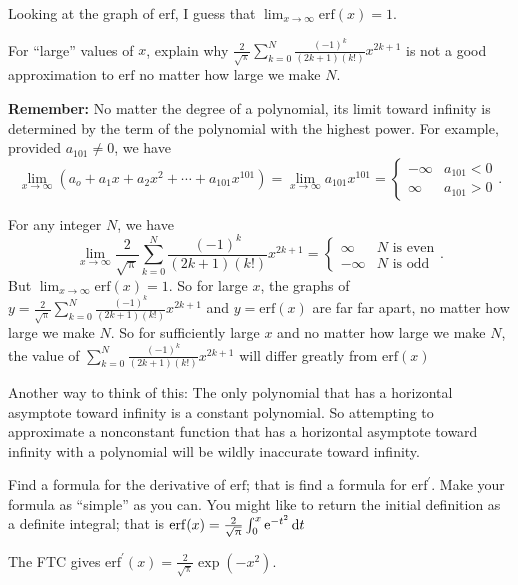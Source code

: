 \documentclass[12pt,fleqn,answers]{exam}
\newcommand{\erf}{\mathrm{erf}}
\begin{document}
\begin{questions}
\begin{solution}%
Looking at the graph of $\erf$, I guess that $\displaystyle \lim_{x \to \infty} \erf(x) = 1$.

\end{solution}

\newpage

\question [1]   For ``large'' values of $x$, explain why 
$\frac{2}{\sqrt{\uppi}}  \sum_{k=0}^{N} \frac{(-1)^k}{ (2 k + 1) (k !)}   x^{2 k +1}$ is not a good approximation to $\erf$
no matter how large we make $N$.  

\textbf{Remember:} No matter the degree of a polynomial, its limit toward infinity is determined 
by the term of the polynomial with the highest power.  For example, provided $a_{101} \neq 0$, we have 
\begin{equation*}
  \lim_{x \to \infty}  \left( a_o + a_1 x + a_2 x^2 + \cdots + a_{101} x^{101} \right)  =  
  \lim_{x \to \infty} a_{101} x^{101}  = \begin{cases}  -\infty & a_{101} < 0 \\ \infty & a_{101} > 0 \end{cases}.
\end{equation*}

\begin{solution}[3.5in]
For any integer $N$, we have $$\lim_{x \to \infty} \frac{2}{\sqrt{\uppi}}  \sum_{k=0}^{N} \frac{(-1)^k}{ (2 k + 1) (k !)}   x^{2 k +1} = \begin{cases} \infty & N \text{ is even} \\ -\infty & N \text{ is odd} \end{cases}. $$ But $\displaystyle \lim_{x \to \infty} \erf(x) = 1$. 
So for large $x$,  the graphs of $y = \frac{2}{\sqrt{\uppi}}  \sum_{k=0}^{N} \frac{(-1)^k}{ (2 k + 1) (k !)}   x^{2 k +1}$
and $y  = \erf(x) $ are far far apart, no matter how large we make $N$.  So for sufficiently large $x$ and no matter how 
large we make $N$, the value of $\sum_{k=0}^{N} \frac{(-1)^k}{ (2 k + 1) (k !)}   x^{2 k +1}$ will differ greatly
from $\erf(x)$

\quad Another way to think of this: The only polynomial that has a horizontal asymptote toward infinity is a constant polynomial. So attempting
to approximate a nonconstant function that has a horizontal asymptote toward infinity with a polynomial 
will be wildly inaccurate toward infinity.

\end{solution}

\question  [1] Find a formula for the derivative of $\erf$; that is find a formula for $\erf^\prime$.  Make your formula as ``simple'' as you can.  You might like to return the initial definition as a definite integral; that is $\erf(x) = \frac{2}{\sqrt{\uppi}} \large \int_0^x \mathrm{e}^{-t^2} \, \mathrm{d} t$

\begin{solution} The FTC gives $\erf^\prime(x)  = \frac{2}{\sqrt{\uppi}} \exp(-x^2).$

\end{solution}

\end{questions}
\end{document}
